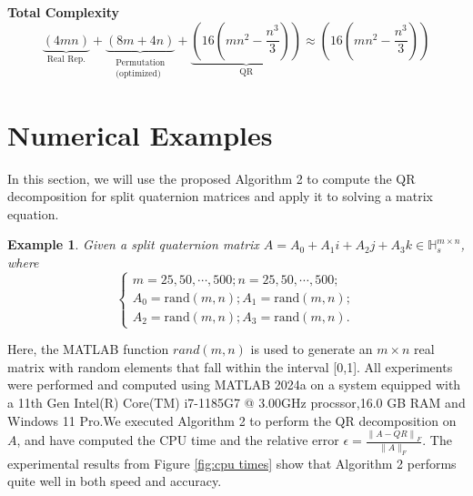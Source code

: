 \documentclass[1p]{elsarticle}
\newtheorem{example}[theorem]{Example}
\numberwithin{equation}{section}
\begin{document}
\textbf{Total Complexity}
$$
\underbrace{(4mn)}_{\text{Real Rep.}} + \underbrace{(8m+4n)}_{\substack{\text{Permutation} \\ \text{(optimized)}}} + \underbrace{(16(mn^2-\frac{n^3}{3}))}_{\text{QR}} \approx \boxed{(16(mn^2-\frac{n^3}{3}))}
$$  


\section{Numerical Examples}
In this section,  we will use the proposed  Algorithm 2 to compute the QR decomposition for split quaternion matrices and apply it to solving a matrix equation.
\begin{example}
    Given a split quaternion matrix $A = A_{0}+A_{1}i+A_{2}j+A_{3}k\in \mathbb{H}_s^{m\times n}$, where
    \begin{equation}
       \begin{cases}
            m = 25,50,\cdots,500;
            n = 25,50,\cdots,500;  \\
            A_{0}=\text{rand}(m,n);
            A_{1}=\text{rand}(m,n); \\
            A_{2}=\text{rand}(m,n);
            A_{3}=\text{rand}(m,n).
        \end{cases} \label{eq:example2}
    \end{equation}
\end{example}
Here, the MATLAB function  $rand(m,n)$ is used to generate an $m \times n$ real matrix with random elements that fall within the interval [0,1]. All experiments were performed and computed using MATLAB 2024a on a system equipped with a 11th Gen Intel(R) Core(TM) i7-1185G7 @ 3.00GHz procssor,16.0 GB RAM and Windows 11 Pro.We executed Algorithm 2 to perform the QR decomposition on $A$, and have computed the CPU time and the relative error
$\epsilon = \frac{\left\|A - Q R\right\|_{F}}{\|A\|_{F}}.$
The experimental results from Figure \ref{fig:cpu times} show that Algorithm 2 performs quite well in both speed and accuracy. 
\end{document}
